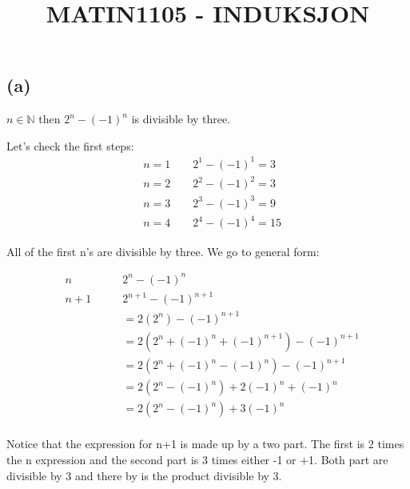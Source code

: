 
\title{MATIN1105 - INDUKSJON}

\mnfrontpage
\pagebreak




\section{}%

\subsection*{(a)}


$n \in \mathbb{N}$ then $2^n - (-1)^n$ is divisible by three.


Let's check the first steps: 
\begin{align*}
&n = 1 \qquad 2^1 - (-1)^1 = 3\\
&n = 2 \qquad 2^2 - (-1)^2 = 3\\
&n = 3 \qquad 2^3 - (-1)^3 = 9\\
&n = 4 \qquad 2^4 - (-1)^4 = 15
\end{align*}

All of the first n's are divisible by three. 
We go to general form: 

\begin{align*}
&n \qquad &2^n - (-1)^n\\
&n+1 \qquad &2^{n+1} - (-1)^{n+1} \\
& &= 2(2^{n}) - (-1)^{n+1}\\
& &= 2(2^{n} + (-1)^n  + (-1)^{n+1}) - (-1)^{n+1}\\
& &= 2(2^{n} + (-1)^n  - (-1)^{n}) - (-1)^{n+1}\\
& &= 2(2^{n}- (-1)^{n}) + 2(-1)^n  + (-1)^{n}\\
& &= 2(2^{n}- (-1)^{n}) + 3(-1)^n \\
\end{align*}

Notice that the expression for n+1 is made up by a two part. The first is 2 times the n expression and the second part is 3 times either -1 or +1. Both part are divisible by 3 and there by is the product divisible by 3. 








